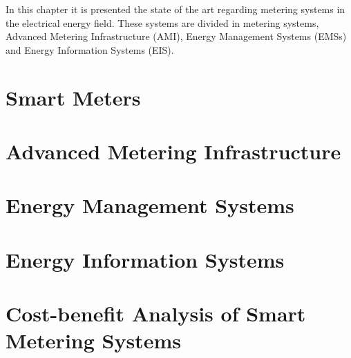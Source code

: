 In this chapter it is presented the state of the art regarding metering systems in the electrical energy field. These systems are divided in metering systems, Advanced Metering Infrastructure (AMI), Energy Management Systems (EMSs) and Energy Information Systems (EIS).

\section{Smart Meters}



\vspace{3em}
\section{Advanced Metering Infrastructure}





\vspace{3em}

\section{Energy Management Systems}




\vspace{3em}

\section{Energy Information Systems}



\vspace{3em}
\section{Cost-benefit Analysis of Smart Metering Systems}




\vspace{3em}
